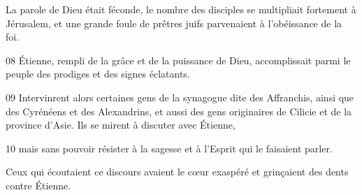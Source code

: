 La parole de Dieu était féconde, le nombre des disciples se multipliait fortement à Jérusalem, et une grande foule de prêtres juifs parvenaient à l’obéissance de la foi.

08 Étienne, rempli de la grâce et de la puissance de Dieu, accomplissait parmi le peuple des prodiges et des signes éclatants.

09 Intervinrent alors certaines gens de la synagogue dite des Affranchis, ainsi que des Cyrénéens et des Alexandrins, et aussi des gens originaires de Cilicie et de la province d’Asie. Ils se mirent à discuter avec Étienne,

10 mais sans pouvoir résister à la sagesse et à l’Esprit qui le faisaient parler.

Ceux qui écoutaient ce discours avaient le cœur exaspéré
	et grinçaient des dents contre Étienne.
